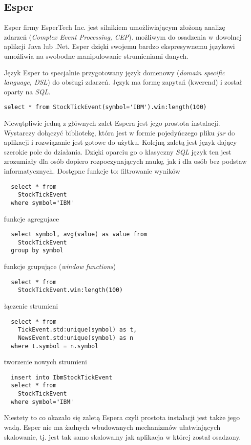 \subsection{Esper}
Esper firmy EsperTech Inc. jest silnikiem umożliwiającym złożoną analizę zdarzeń
(\textit{Complex Event Processing, CEP}).
możliwym do osadzenia w dowolnej aplikcji Java lub .Net.
Esper dzięki swojemu bardzo ekspresywnemu językowi umożliwia na swobodne manipulowanie strumieniami danych.

Język Esper to specjalnie przygotowany język domenowy (\textit{domain specific language, DSL}) do obsługi zdarzeń.
Język ma formę zapytań (kwerend) i został oparty na \textit{SQL}.

\begin{lstlisting}[captionpos=b, caption=Przykładowe zapytanie w języku Esper]
  select * from StockTickEvent(symbol='IBM').win:length(100)
\end{lstlisting}

Niewątpliwie jedną z głównych zalet Espera jest jego prostota instalacji.
Wystarczy dołączyć bibliotekę,
która jest w formie pojedyńczego pliku \textit{jar}
do aplikacji i rozwiązanie jest gotowe do użytku.
Kolejną zaletą jest język dający szerokie pole do działania.
Dzięki oparciu go o klasyczny \textit{SQL} język ten jest zrozumiały dla osób dopiero rozpoczynających naukę,
jak i dla osób bez podstaw informatycznych.
Dostępne funkcje to:
filtrowanie wyników
\begin{lstlisting}
  select * from
    StockTickEvent
  where symbol='IBM'
\end{lstlisting}
funkcje agregujace
\begin{lstlisting}
  select symbol, avg(value) as value from
    StockTickEvent
  group by symbol
\end{lstlisting}
funkcje grupujące (\textit{window functions})
\begin{lstlisting}
  select * from
    StockTickEvent.win:length(100)
\end{lstlisting}
łączenie strumieni
\begin{lstlisting}
  select * from
    TickEvent.std:unique(symbol) as t,
    NewsEvent.std:unique(symbol) as n
  where t.symbol = n.symbol
\end{lstlisting}
tworzenie nowych strumieni
\begin{lstlisting}
  insert into IbmStockTickEvent
  select * from
    StockTickEvent
  where symbol='IBM'
\end{lstlisting}

Niestety to co okazało się zaletą Espera czyli prostota instalacji
jest także jego wadą.
Esper nie ma żadnych wbudowanych mechanizmów ułatwiających skalowanie,
tj. jest tak samo skalowalny jak aplikacja w której został osadzony.
